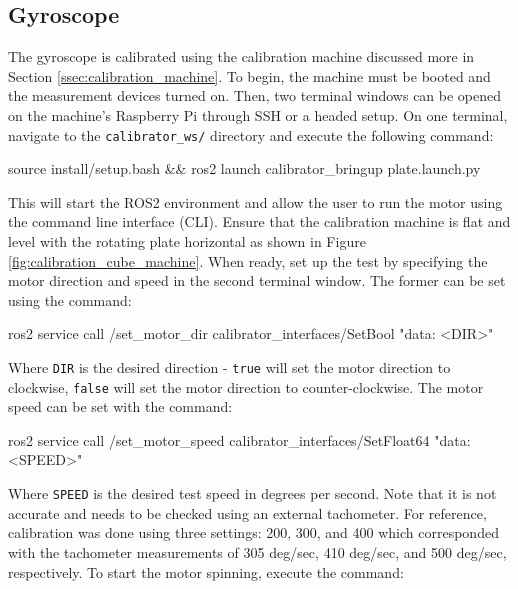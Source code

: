 \subsection{Gyroscope} \label{ssec:calibration_gyroscope}
The gyroscope is calibrated using the calibration machine discussed more in Section \ref{ssec:calibration_machine}.
To begin, the machine must be booted and the measurement devices turned on.
Then, two terminal windows can be opened on the machine's Raspberry Pi through SSH or a headed setup.
On one terminal, navigate to the \lstinline[style=customInline]|calibrator_ws/| directory and execute the following command:

\begin{bash}
    source install/setup.bash && ros2 launch calibrator_bringup plate.launch.py
\end{bash}

\noindent This will start the ROS2 environment and allow the user to run the motor using the command line interface (CLI).
Ensure that the calibration machine is flat and level with the rotating plate horizontal as shown in Figure \ref{fig:calibration_cube_machine}.
When ready, set up the test by specifying the motor direction and speed in the second terminal window.
The former can be set using the command:

\begin{bash}
    ros2 service call /set_motor_dir calibrator_interfaces/SetBool "{data: <DIR>}"
\end{bash}

\noindent Where \lstinline[style=customInline]|DIR| is the desired direction - \lstinline[style=customInline]|true| will set the motor direction to clockwise, \lstinline[style=customInline]|false| will set the motor direction to counter-clockwise.
The motor speed can be set with the command:

\begin{bash}
    ros2 service call /set_motor_speed calibrator_interfaces/SetFloat64 "{data: <SPEED>}"
\end{bash}

\noindent Where \lstinline[style=customInline]|SPEED| is the desired test speed in degrees per second.
Note that it is not accurate and needs to be checked using an external tachometer.
For reference, calibration was done using three settings: 200, 300, and 400 which corresponded with the tachometer measurements of 305 deg/sec, 410 deg/sec, and 500 deg/sec, respectively.
To start the motor spinning, execute the command:


